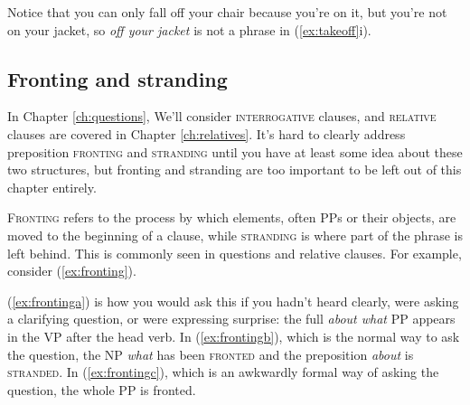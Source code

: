 \begin{multicols}{2}
\ea
    \ea \label{ex:takeoff}
    \z
    \ex \label{ex:chairoff}
        \label{ex:chairoffb}
        \z
    \z
\z
\end{multicols}

Notice that you can only fall off your chair because you're on it, but you're not on your jacket, so \textit{off your jacket} is not a phrase in (\ref{ex:takeoff}i).

\subsection{Fronting and stranding} \label{sec:preposition-stranding}

In Chapter \ref{ch:questions}, We'll consider \textsc{interrogative} clauses, and \textsc{relative} clauses are covered in Chapter \ref{ch:relatives}. It's hard to clearly address preposition \textsc{fronting} and \textsc{stranding} until you have at least some idea about these two structures, but fronting and stranding are too important to be left out of this chapter entirely.

\textsc{Fronting} refers to the process by which elements, often PPs or their objects, are moved to the beginning of a clause, while \textsc{stranding} is where part of the phrase is left behind. This is commonly seen in questions and relative clauses. For example, consider (\ref{ex:fronting}).

\ea \label{ex:fronting}
    \label{ex:frontinga}
    \label{ex:frontingb}
    \label{ex:frontingc}
    \z
\z

(\ref{ex:frontinga}) is how you would ask this if you hadn't heard clearly, were asking a clarifying question, or were expressing surprise: the full \textit{about what} PP appears in the VP after the head verb. In (\ref{ex:frontingb}), which is the normal way to ask the question, the NP \textit{what} has been \textsc{fronted} and the preposition \textit{about} is \textsc{stranded}. In (\ref{ex:frontingc}), which is an awkwardly formal way of asking the question, the whole PP is fronted.

